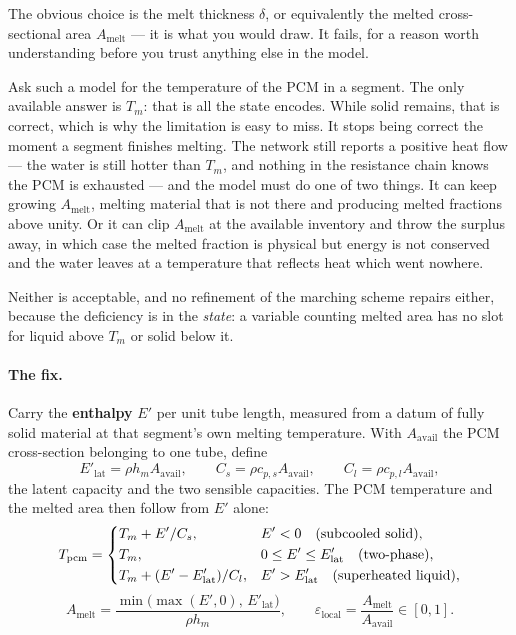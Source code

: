 \documentclass[11pt,a4paper]{article}
\newcommand{\hm}{\ensuremath{h_{m}}}
\newcommand{\Tm}{\ensuremath{T_{m}}}
\newcommand{\Tpcm}{\ensuremath{T_{\mathrm{pcm}}}}
\newcommand{\Aav}{\ensuremath{A_{\mathrm{avail}}}}
\newcommand{\Amelt}{\ensuremath{A_{\mathrm{melt}}}}
\newcommand{\Elat}{\ensuremath{E'_{\mathrm{lat}}}}
\newcommand{\epsloc}{\ensuremath{\varepsilon_{\mathrm{local}}}}
\begin{document}
The obvious choice is the melt thickness $\delta$, or equivalently the melted
cross-sectional area $\Amelt$ --- it is what you would draw. It fails, for a
reason worth understanding before you trust anything else in the model.

Ask such a model for the temperature of the PCM in a segment. The only
available answer is $\Tm$: that is all the state encodes. While solid remains,
that is correct, which is why the limitation is easy to miss. It stops being
correct the moment a segment finishes melting. The network still reports a
positive heat flow --- the water is still hotter than $\Tm$, and nothing in the
resistance chain knows the PCM is exhausted --- and the model must do one of two
things. It can keep growing $\Amelt$, melting material that is not there and
producing melted fractions above unity. Or it can clip $\Amelt$ at the
available inventory and throw the surplus away, in which case the melted
fraction is physical but energy is not conserved and the water leaves at a
temperature that reflects heat which went nowhere.

Neither is acceptable, and no refinement of the marching scheme repairs either,
because the deficiency is in the \emph{state}: a variable counting melted area
has no slot for liquid above $\Tm$ or solid below it.

\paragraph{The fix.}
Carry the \textbf{enthalpy} $E'$ per unit tube length, measured from a datum of
fully solid material at that segment's own melting temperature. With $\Aav$ the
PCM cross-section belonging to one tube, define
\begin{equation}
  \Elat = \rho\hm\Aav, \qquad
  C_s = \rho c_{p,s}\Aav, \qquad
  C_l = \rho c_{p,l}\Aav,
  \label{eq:caps}
\end{equation}
the latent capacity and the two sensible capacities. The PCM temperature and
the melted area then follow from $E'$ alone:
\begin{equation}
  \Tpcm =
  \begin{dcases}
    \Tm + E'/C_s, & E' < 0 \quad\text{(subcooled solid)},\\
    \Tm, & 0 \le E' \le \Elat \quad\text{(two-phase)},\\
    \Tm + (E'-\Elat)/C_l, & E' > \Elat \quad\text{(superheated liquid)},
  \end{dcases}
  \label{eq:curve}
\end{equation}
\begin{equation}
  \Amelt = \frac{\min\bigl(\max(E',0),\,\Elat\bigr)}{\rho\hm},
  \qquad
  \epsloc = \frac{\Amelt}{\Aav} \in [0,1].
  \label{eq:amelt}
\end{equation}
\end{document}
